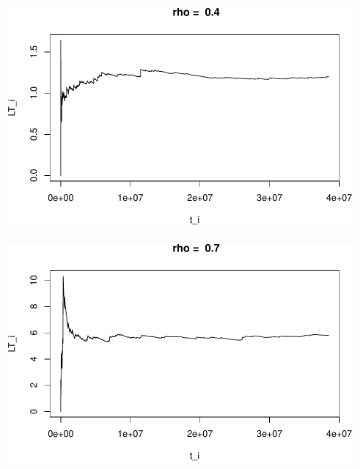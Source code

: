 \documentclass[]{article}
\begin{document}



\begin{figure}[h!]
\begin{subfigure}[b]{.55\linewidth}

\includegraphics[width=\linewidth]{003_files/figure-latex/unnamed-chunk-11-1.pdf}
\end{subfigure}\hfill
\begin{subfigure}[b]{.55\linewidth}
\includegraphics[width=\linewidth]{003_files/figure-latex/unnamed-chunk-11-2.pdf}
\end{subfigure}\vfill
\end{figure}
\end{document}
